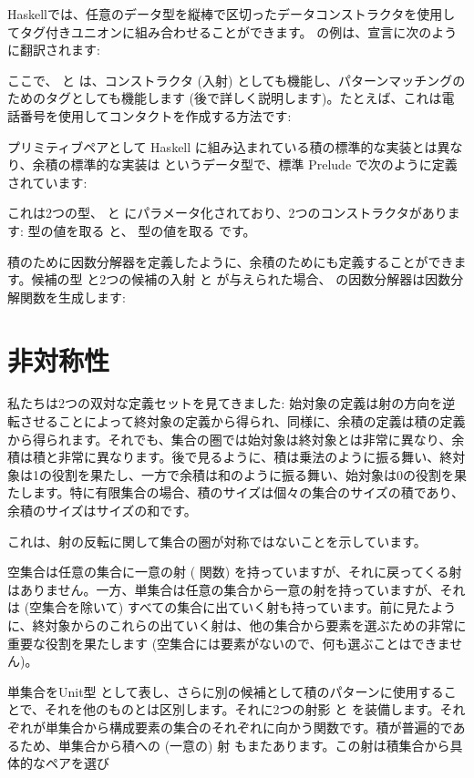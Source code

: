 Haskellでは、任意のデータ型を縦棒で区切ったデータコンストラクタを使用してタグ付きユニオンに組み合わせることができます。 の例は、宣言に次のように翻訳されます:

ここで、 と  は、コンストラクタ (入射) としても機能し、パターンマッチングのためのタグとしても機能します (後で詳しく説明します)。たとえば、これは電話番号を使用してコンタクトを作成する方法です:

プリミティブペアとして Haskell に組み込まれている積の標準的な実装とは異なり、余積の標準的な実装は  というデータ型で、標準 Prelude で次のように定義されています:

これは2つの型、 と  にパラメータ化されており、2つのコンストラクタがあります:  型の値を取る  と、 型の値を取る  です。

積のために因数分解器を定義したように、余積のためにも定義することができます。候補の型  と2つの候補の入射  と  が与えられた場合、 の因数分解器は因数分解関数を生成します:


\section{非対称性}

私たちは2つの双対な定義セットを見てきました: 始対象の定義は射の方向を逆転させることによって終対象の定義から得られ、同様に、余積の定義は積の定義から得られます。それでも、集合の圏では始対象は終対象とは非常に異なり、余積は積と非常に異なります。後で見るように、積は乗法のように振る舞い、終対象は1の役割を果たし、一方で余積は和のように振る舞い、始対象は0の役割を果たします。特に有限集合の場合、積のサイズは個々の集合のサイズの積であり、余積のサイズはサイズの和です。

これは、射の反転に関して集合の圏が対称ではないことを示しています。

空集合は任意の集合に一意の射 ( 関数) を持っていますが、それに戻ってくる射はありません。一方、単集合は任意の集合から一意の射を持っていますが、それは (空集合を除いて) すべての集合に出ていく射も持っています。前に見たように、終対象からのこれらの出ていく射は、他の集合から要素を選ぶための非常に重要な役割を果たします (空集合には要素がないので、何も選ぶことはできません)。

単集合をUnit型 \code{()} として表し、さらに別の候補として積のパターンに使用することで、それを他のものとは区別します。それに2つの射影  と  を装備します。それぞれが単集合から構成要素の集合のそれぞれに向かう関数です。積が普遍的であるため、単集合から積への (一意の) 射  もまたあります。この射は積集合から具体的なペアを選び

